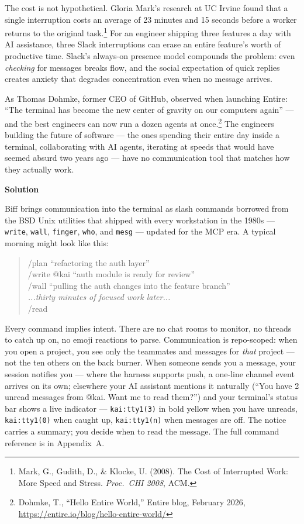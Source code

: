 \documentclass[11pt,letterpaper]{article}
\newcommand{\prsection}[1]{%
  \vspace{1em}%
  {\large\bfseries\color{SectionBlue}#1}%
  \vspace{0.3em}\par%
}
\begin{document}
The cost is not hypothetical. Gloria Mark's research at UC Irvine found that
a single interruption costs an average of 23 minutes and 15 seconds before a
worker returns to the original task.\footnote{Mark, G., Gudith, D., \&
Klocke, U. (2008). The Cost of Interrupted Work: More Speed and Stress.
\textit{Proc.\ CHI 2008}, ACM.} For an engineer shipping three features a
day with AI assistance, three Slack interruptions can erase an entire
feature's worth of productive time. Slack's always-on
presence model compounds the problem: even \emph{checking} for messages
breaks flow, and the social expectation of quick replies creates anxiety that
degrades concentration even when no message arrives.

As Thomas Dohmke, former CEO of GitHub, observed when launching
Entire: ``The terminal has become the new center of gravity on our
computers again'' --- and the best engineers can now run a dozen agents at
once.\footnote{Dohmke, T., ``Hello Entire World,'' Entire blog, February
2026, \url{https://entire.io/blog/hello-entire-world/}} The engineers
building the future of software --- the ones spending their entire day
inside a terminal, collaborating with AI agents, iterating at speeds that
would have seemed absurd two years ago --- have no communication tool that
matches how they actually work.

\prsection{Solution}

Biff brings communication into the terminal as slash commands borrowed from
the BSD Unix utilities that shipped with every workstation in the 1980s ---
\texttt{write}, \texttt{wall}, \texttt{finger}, \texttt{who},
and \texttt{mesg} --- updated for the MCP era. A typical morning might look
like this:

\begin{quote}
\ttfamily
\small
/plan ``refactoring the auth layer'' \\
/write @kai ``auth module is ready for review'' \\
/wall ``pulling the auth changes into the feature branch'' \\
\textnormal{\textit{...thirty minutes of focused work later...}} \\
/read
\end{quote}

Every command implies intent. There are no chat rooms to monitor, no threads to
catch up on, no emoji reactions to parse. Communication is repo-scoped:
when you open a project, you see only the teammates and messages
for \emph{that} project --- not the ten others on the back burner. When
someone sends you a message, your session notifies you --- where the harness
supports push, a one-line channel event arrives on its own; elsewhere your AI
assistant mentions it naturally (``You have 2 unread messages from @kai. Want me to read
them?'') and your terminal's status bar shows a live indicator ---
\texttt{kai:tty1(3)} in bold yellow when you have unreads,
\texttt{kai:tty1(0)} when caught up, \texttt{kai:tty1(n)} when messages are
off. The notice carries a summary; you decide when to read the message. The full command reference is in Appendix~A.
\end{document}
